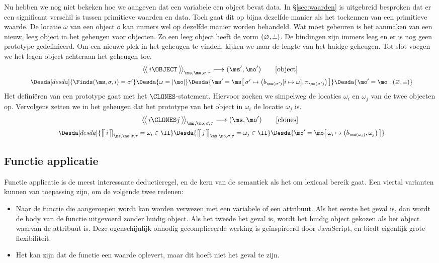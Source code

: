Nu hebben we nog niet bekeken hoe we aangeven dat een variabele een object bevat data. In §\ref{sec:waarden} is uitgebreid besproken dat er een significant verschil is tussen primitieve waarden en data. Toch gaat dit op bijna dezelfde manier als het toekennen van een primitieve waarde. De locatie $\omega$ van een object $o$ kan immers wel op dezelfde manier worden behandeld. Wat moet gebeuren is het aanmaken van een nieuw, leeg object in het geheugen voor objecten. Zo een leeg object heeft de vorm $(\varnothing, \nil)$. De bindingen zijn immers leeg en er is nog geen prototype gedefinieerd. Om een nieuwe plek in het geheugen te vinden, kijken we naar de lengte van het huidge geheugen. Tot slot voegen we het legen object achteraan het geheugen toe.
%
\begin{gather*}
  \Config{i \OBJECT}{\ms, \mo, \sigma, \tau}
  \longrightarrow
  (\ms', \mo')
  \tag*{[object]} \\
  \Desdas{
    \Desda[desda]{\Finds(\ms, \sigma, i) = \sigma'}
    \Desda{\omega = |\mo|}
    \Desda{\ms' = \ms \surr{ \sigma' \mapsto \big(b_{\ms(\sigma')}[i\mapsto \omega], \pi_{\ms(\sigma')}\big) }}
    \Desda{\mo' = \mo : (\varnothing,\nil)}
  }
\end{gather*}
%
Het definiëren van een prototype gaat met het $\CLONES$-statement. Hiervoor zoeken we simpelweg de locaties $\omega_i$ en $\omega_j$ van de twee objecten op. Vervolgens zetten we in het geheugen dat het prototype van het object in $\omega_i$ de locatie $\omega_j$ is.
%
\begin{gather*}
  \Config{i \CLONES j}{\ms, \mo, \sigma, \tau}
  \longrightarrow
  (\ms, \mo')
  \tag*{[clones]} \\
  \Desdas{
    \Desda[desda]{\Express{i}{\ms,\mo,\sigma,\tau} = \omega_i \in \II}
    \Desda{\Express{j}{\ms,\mo,\sigma,\tau} = \omega_j \in \II}
    \Desda{\mo' = \mo \surr{ \omega_i \mapsto \big(b_{\mo(\omega_i)}, \omega_j\big) }}
  }
\end{gather*}

\subsection{Functie applicatie}

Functie applicatie is de meest interessante deductieregel, en de kern van de semantiek als het om lexicaal bereik gaat. Een viertal varianten kunnen van toepassing zijn, om de volgende twee redenen:
\begin{itemize}
  \item Naar de functie die aangeroepen wordt kan worden verwezen met een variabele of een attribuut. Als het eerste het geval is, dan wordt de body van de functie uitgevoerd zonder huidig object. Als het tweede het geval is, wordt het huidig object gekozen als het object waarvan de attribuut is. Deze ogenschijnlijk onnodig gecompliceerde werking is geïnspireerd door JavaScript, en biedt eigenlijk grote flexibiliteit.
  \item Het kan zijn dat de functie een waarde oplevert, maar dit hoeft niet het geval te zijn.
\end{itemize}

